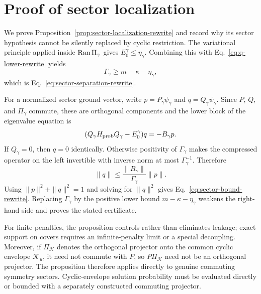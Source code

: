 \section{Proof of sector localization}
\label{app:sector-localization}

We prove Proposition~\ref{prop:sector-localization-rewrite} and record why
its sector hypothesis cannot be silently replaced by cyclic restriction.
The variational principle applied inside $\operatorname{Ran}\Pi_\gamma$ gives
$E_0^\gamma\leq\eta_\gamma$.  Combining this with
Eq.~\eqref{eq:q-lower-rewrite} yields
\begin{equation}
 \Gamma_\gamma\geq m-\kappa-\eta_\gamma,
\end{equation}
which is Eq.~\eqref{eq:sector-separation-rewrite}.

For a normalized sector ground vector, write
$p=P_\gamma\psi_\gamma$ and $q=Q_\gamma\psi_\gamma$.  Since $P$, $Q$,
and $\Pi_\gamma$ commute, these are orthogonal components and the lower
block of the eigenvalue equation is
\begin{equation}
 (Q_\gamma H_{\rm prob}Q_\gamma-E_0^\gamma)q=-B_\gamma p.
 \label{eq:app-sector-block}
\end{equation}
If $Q_\gamma=0$, then $q=0$ identically.  Otherwise positivity of
$\Gamma_\gamma$ makes the compressed operator on the left invertible with
inverse norm at most $\Gamma_\gamma^{-1}$.  Therefore
\begin{equation}
 \|q\|\leq\frac{\|B_\gamma\|}{\Gamma_\gamma}\|p\|.
\end{equation}
Using $\|p\|^2+\|q\|^2=1$ and solving for $\|q\|^2$ gives
Eq.~\eqref{eq:sector-bound-rewrite}.  Replacing $\Gamma_\gamma$ by the
positive lower bound $m-\kappa-\eta_\gamma$ weakens the right-hand side and
proves the stated certificate.

For finite penalties, the proposition controls rather than eliminates
leakage; exact support on covers requires an infinite-penalty limit or a
special decoupling.  Moreover, if $\Pi_{\mathcal K}$ denotes the orthogonal
projector onto the common cyclic envelope $\mathcal K_u$, it need not commute
with $P$, so
$P\Pi_{\mathcal K}$ need not be an orthogonal
projector.  The proposition therefore applies directly to genuine
commuting symmetry sectors.  Cyclic-envelope solution probability must be
evaluated directly or bounded with a separately constructed commuting
projector.
